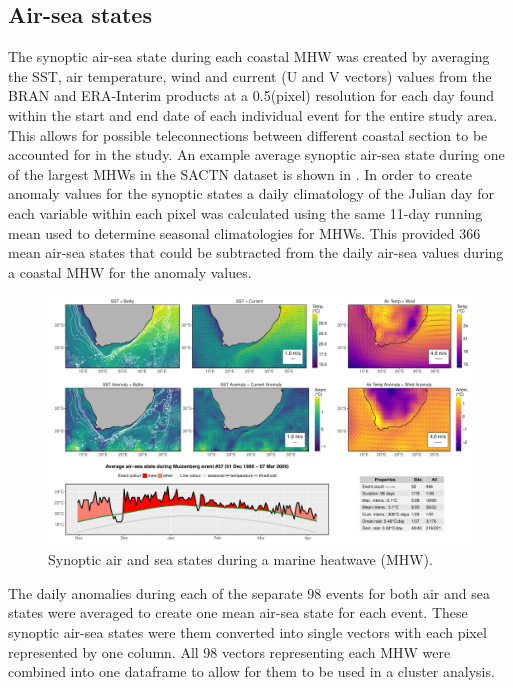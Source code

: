 \documentclass[a4paper,10pt,review]{elsarticle}
\begin{document}
\subsection{Air-sea states}
The synoptic air-sea state during each coastal MHW was created by averaging the SST, air temperature, wind and current (U and V vectors) values from the BRAN and ERA-Interim products at a 0.5\degree (pixel) resolution for each day found within the start and end date of each individual event for the entire study area. This allows for possible teleconnections between different coastal section to be accounted for in the study. An example average synoptic air-sea state during one of the largest MHWs in the SACTN dataset is shown in . In order to create anomaly values for the synoptic states a daily climatology of the Julian day for each variable within each pixel was calculated using the same 11-day running mean used to determine seasonal climatologies for MHWs. This provided 366 mean air-sea states that could be subtracted from the daily air-sea values during a coastal MHW for the anomaly values.

\begin{figure}
\includegraphics[width=1.0\textwidth]{figure_2.pdf}
\caption{Synoptic air and sea states during a marine heatwave (MHW).}
\label{figure2}
\end{figure}

The daily anomalies during each of the separate 98 events for both air and sea states were averaged to create one mean air-sea state for each event. These synoptic air-sea states were them converted into single vectors with each pixel represented by one column. All 98 vectors representing each MHW were combined into one dataframe to allow for them to be used in a cluster analysis.
\end{document}
